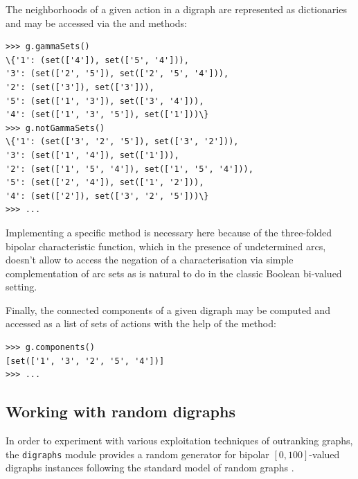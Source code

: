 \documentclass{article}
\newcommand{\+}{\verb+}
\renewcommand{\*}{\back{}}
\newcommand{\Dg}{\texttt{digraphs}\xspace }
\begin{document}
\begin{center}
The neighborhoods of a given action in a digraph are represented as dictionaries and may be accessed via the  and  methods:
\begin{example}
\begin{verbatim}
>>> g.gammaSets()
\{'1': (set(['4']), set(['5', '4'])), 
'3': (set(['2', '5']), set(['2', '5', '4'])), 
'2': (set(['3']), set(['3'])), 
'5': (set(['1', '3']), set(['3', '4'])), 
'4': (set(['1', '3', '5']), set(['1']))\}
>>> g.notGammaSets()
\{'1': (set(['3', '2', '5']), set(['3', '2'])), 
'3': (set(['1', '4']), set(['1'])), 
'2': (set(['1', '5', '4']), set(['1', '5', '4'])), 
'5': (set(['2', '4']), set(['1', '2'])), 
'4': (set(['2']), set(['3', '2', '5']))\}
>>> ...
\end{verbatim}
\end{example}
Implementing a specific  method is necessary here because of the three-folded bipolar characteristic function, which in the presence of undetermined arcs, doesn't allow to access the negation of a characterisation via simple complementation of arc sets as is natural to do in the classic Boolean bi-valued setting.

Finally, the connected components of a given digraph  may be computed and accessed as a list of sets of actions with the help of the  method:
\begin{example}
\begin{verbatim}
>>> g.components()
[set(['1', '3', '2', '5', '4'])]
>>> ...
\end{verbatim}
\end{example}
\subsection{Working with random digraphs}

In order to experiment with various exploitation techniques of outranking graphs, the \Dg module provides a random generator for bipolar $[0,100]$-valued digraphs instances following the standard model of random graphs \cite[see Chapter 2]{Bollobas}. 


\end{center}
\end{document}
